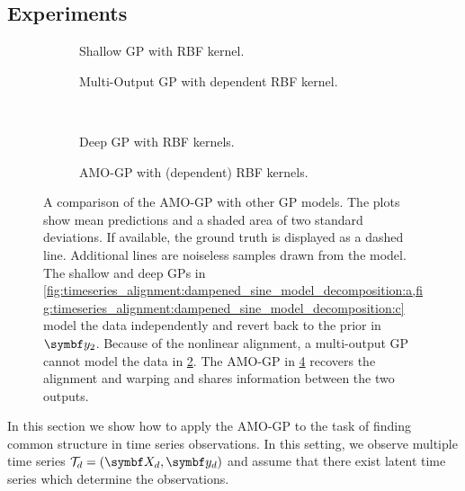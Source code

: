 \subsection{Experiments}
\label{sub:timeseries_alignment:experiments}
\begin{figure}[tp]
    \centering
    \begin{subfigure}{\halffigurewidth}
        \centering
        \caption{
            Shallow GP with RBF kernel.
            \label{fig:timeseries_alignment:dampened_sine_model_decomposition:a}
        }
    \end{subfigure}
    \hfill
    \begin{subfigure}{\halffigurewidth}
        \centering
        \caption{
            Multi-Output GP with dependent RBF kernel.
            \label{fig:timeseries_alignment:dampened_sine_model_decomposition:b}
        }
    \end{subfigure}
    \\[\baselineskip]
    \begin{subfigure}{\halffigurewidth}
        \centering
        \caption{
            Deep GP with RBF kernels.
            \label{fig:timeseries_alignment:dampened_sine_model_decomposition:c}
        }
    \end{subfigure}
    \hfill
    \begin{subfigure}{\halffigurewidth}
        \centering
        \caption{
            AMO-GP with (dependent) RBF kernels.
            \label{fig:timeseries_alignment:dampened_sine_model_decomposition:d}
        }
    \end{subfigure}
    \caption{
        \label{fig:timeseries_alignment:dampened_sine_model_decomposition}
        A comparison of the AMO-GP with other GP models.
        The plots show mean predictions and a shaded area of two standard deviations.
        If available, the ground truth is displayed as a dashed line.
        Additional lines are noiseless samples drawn from the model.
        The shallow and deep GPs in \cref{fig:timeseries_alignment:dampened_sine_model_decomposition:a,fig:timeseries_alignment:dampened_sine_model_decomposition:c} model the data independently and revert back to the prior in $\rv{y_2}$.
        Because of the nonlinear alignment, a multi-output GP cannot model the data in \cref{fig:timeseries_alignment:dampened_sine_model_decomposition:b}.
        The AMO-GP in \cref{fig:timeseries_alignment:dampened_sine_model_decomposition:d} recovers the alignment and warping and shares information between the two outputs.
    }
\end{figure}
In this section we show how to apply the AMO-GP to the task of finding common structure in time series observations.
In this setting, we observe multiple time series $\Tc_d = (\mat{X_d}, \mat{y_d})$ and assume that there exist latent time series which determine the observations.

